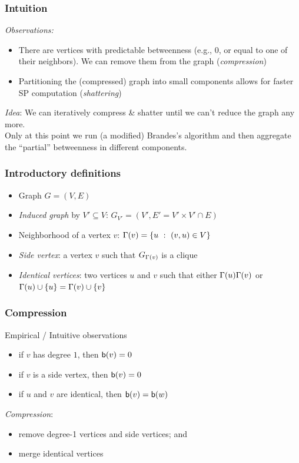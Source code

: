 \begin{frame}
  \frametitle{Intuition}
  \emph{Observations:}
  \begin{itemize}
    \item There are vertices with predictable betweenness (e.g., 0, or equal to one
      of their neighbors). We can remove them from the graph (\emph{compression})
    \item Partitioning the (compressed) graph into small components allows for
      faster SP computation (\emph{shattering})
  \end{itemize}
  \pause
  \emph{Idea}:
  We can iteratively compress \& shatter until we can't reduce the graph any
  more.\\
  \qquad Only at this point we run (a modified) Brandes's algorithm and then
  aggregate the ``partial'' betweenness in different components.
\end{frame}

\begin{frame}
  \frametitle{Introductory definitions}
  \vfill
  \begin{itemize}
    \item Graph $G=(V,E)$
    \item \emph{Induced graph} by $V'\subseteq V$: $G_{V'}=(V', E'=V'\times V'\cap E)$
    \pause
    \item Neighborhood of a vertex $v$: $\Gamma(v)=\{u~:~(v,u)\in V\}$
    \pause
  \item \emph{Side vertex}: a vertex $v$ such that $G_{\Gamma(v)}$ is a clique
    \pause
  \item \emph{Identical vertices}: two vertices $u$ and $v$ such that either
      $\Gamma(u)\Gamma(v)$ or
      $\Gamma(u)\cup\{u\}=\Gamma(v)\cup\{v\}$
  \end{itemize}
  \vfill
\end{frame}


\begin{frame}
  \frametitle{Compression}
  \vfill
  Empirical / Intuitive observations
  \begin{itemize}
    \item if $v$ has degree $1$, then $\mathsf{b}(v)=0$
    \item if $v$ is a side vertex, then $\mathsf{b}(v)=0$
    \item if $u$ and $v$ are identical, then $\mathsf{b}(v)=\mathsf{b}(w)$
  \end{itemize}
  \pause
  \vfill
  \emph{Compression}:
  \begin{itemize}
    \item remove degree-1 vertices and side vertices; and
    \item merge identical vertices
  \end{itemize}
  \vfill
\end{frame}

